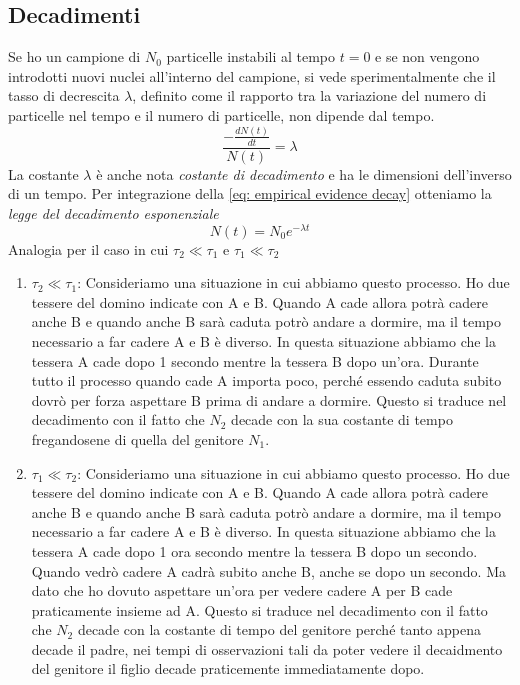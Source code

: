 \subsection{Decadimenti}
Se ho un campione di $N_0$ particelle instabili al tempo $t = 0$ e se non vengono introdotti nuovi nuclei all'interno del campione, si vede sperimentalmente che il tasso di decrescita $\lambda$, definito come il rapporto tra la variazione del numero di particelle nel tempo e il numero di particelle, non dipende dal tempo.
    \begin{equation}
        \frac{\displaystyle - \frac{d N(t)}{dt}}{N(t)} = \lambda
        \label{eq: empirical evidence decay}
    \end{equation}
La costante $\lambda$ è anche nota \textit{costante di decadimento} e ha le dimensioni dell'inverso di un tempo. Per integrazione della \eqref{eq: empirical evidence decay} otteniamo la \textit{legge del decadimento esponenziale}
    \begin{equation*}
        \boxed{N(t) = N_0 e^{- \lambda t}}
    \end{equation*}
Analogia per il caso in cui $\tau_2 \ll \tau_1$ e $\tau_1 \ll \tau_2$ 
    \begin{enumerate}
        \item $\tau_2 \ll \tau_1$: Consideriamo una situazione in cui abbiamo questo processo. Ho due tessere del domino indicate con A e B. Quando A cade allora potrà cadere anche B e quando anche B sarà caduta potrò andare a dormire, ma il tempo necessario a far cadere A e B è diverso. In questa situazione abbiamo che la tessera A cade dopo 1 secondo mentre la tessera B dopo un'ora. Durante tutto il processo quando cade A importa poco, perché essendo caduta subito dovrò per forza aspettare B prima di andare a dormire. Questo si traduce nel decadimento con il fatto che $N_2$ decade con la sua costante di tempo fregandosene di quella del genitore $N_1$.
        \item $\tau_1 \ll \tau_2$: Consideriamo una situazione in cui abbiamo questo processo. Ho due tessere del domino indicate con A e B. Quando A cade allora potrà cadere anche B e quando anche B sarà caduta potrò andare a dormire, ma il tempo necessario a far cadere A e B è diverso. In questa situazione abbiamo che la tessera A cade dopo 1 ora secondo mentre la tessera B dopo un secondo. Quando vedrò cadere A cadrà subito anche B, anche se dopo un secondo. Ma dato che ho dovuto aspettare un'ora per vedere cadere A per B cade praticamente insieme ad A. Questo si traduce nel decadimento con il fatto che $N_2$ decade con la costante di tempo del genitore perché tanto appena decade il padre, nei tempi di osservazioni tali da poter vedere il decaidmento del genitore il figlio decade praticemente immediatamente dopo.
    \end{enumerate}

